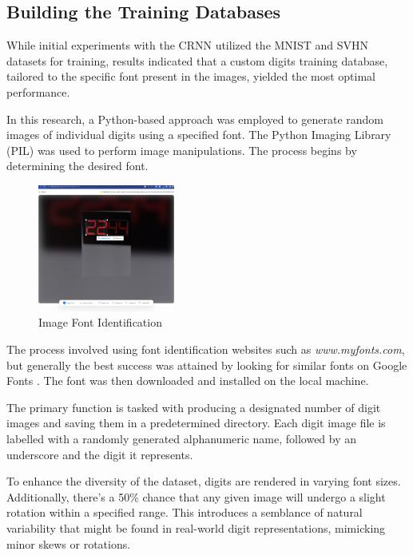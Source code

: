 \subsection{Building the Training Databases}
While initial experiments with the CRNN utilized the MNIST \cite{MnistTensorFlowDatasets} and SVHN \cite{StreetViewHouse} datasets for training, results indicated that a custom digits training database, tailored to the specific font present in the images, yielded the most optimal performance.

In this research, a Python-based approach was employed to generate random images of individual digits using a specified font. The Python Imaging Library (PIL) was used to perform image manipulations. The process begins by determining the desired font.

\begin{figure}[ht]
    \centering
    \includegraphics[width=0.4\textwidth]{Figures/find_font/myfonts.jpg}
    \caption[Image Font Identification]{Image Font Identification}
    \label{fig:Image Font Identification}
\end{figure}

The process involved using font identification websites such as \textit{www.myfonts.com}\cite{WhatTheFontMyFonts}, but generally the best success was attained by looking for similar fonts on Google Fonts \cite{BrowseFontsGoogle}. The font was then downloaded and installed on the local machine.

The primary function is tasked with producing a designated number of digit images and saving them in a predetermined directory. Each digit image file is labelled with a randomly generated alphanumeric name, followed by an underscore and the digit it represents.

To enhance the diversity of the dataset, digits are rendered in varying font sizes. Additionally, there's a 50\% chance that any given image will undergo a slight rotation within a specified range. This introduces a semblance of natural variability that might be found in real-world digit representations, mimicking minor skews or rotations.


